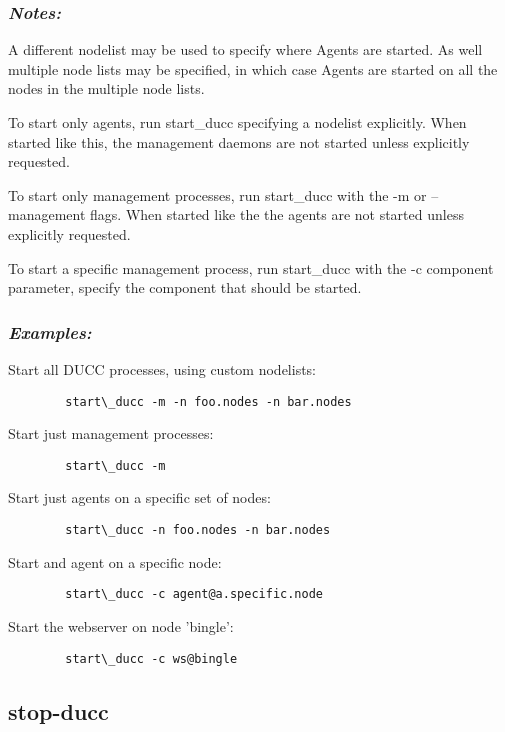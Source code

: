       \subsubsection{{\em Notes: }}
      A different nodelist may be used to specify where Agents are started. As well multiple node 
      lists may be specified, in which case Agents are started on all the nodes in the multiple node 
      lists. 
      
      To start only agents, run start\_ducc specifying a nodelist explicitly. When started like this, the 
      management daemons are not started unless explicitly requested. 
      
      To start only management processes, run start\_ducc with the -m or --management flags. When 
      started like the the agents are not started unless explicitly requested. 
      
      To start a specific management process, run start\_ducc with the -c component parameter, 
      specify the component that should be started. 
  
      \subsubsection{{\em Examples: }}

      Start all DUCC processes, using custom nodelists: 
\begin{verbatim}
        start\_ducc -m -n foo.nodes -n bar.nodes 
\end{verbatim}
      
      Start just management processes: 
\begin{verbatim}
        start\_ducc -m 
\end{verbatim}
      
      Start just agents on a specific set of nodes: 
\begin{verbatim}
        start\_ducc -n foo.nodes -n bar.nodes 
\end{verbatim}
      
      Start and agent on a specific node: 
\begin{verbatim}
        start\_ducc -c agent@a.specific.node 
\end{verbatim}
      
      Start the webserver on node 'bingle': 
\begin{verbatim}
        start\_ducc -c ws@bingle 
\end{verbatim}

    
\subsection{stop-ducc}

